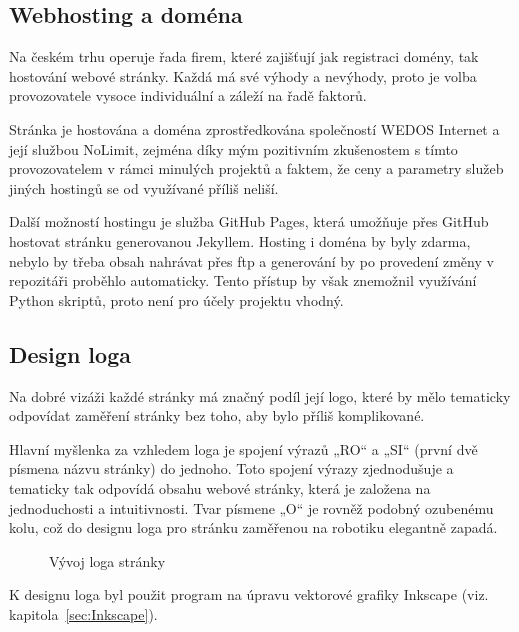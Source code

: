 \documentclass[a4paper, 12pt]{article}
\newcommand*{\fullref}[1]{\hyperref[{#1}]{\ref*{#1}}}
\begin{document}
  \subsection{Webhosting a doména} \label{sec:Webhosting a doména}
  Na českém trhu operuje řada firem, které zajišťují jak registraci domény, tak hostování webové stránky. Každá má své výhody a nevýhody, proto je volba provozovatele vysoce individuální a záleží na řadě faktorů.

  Stránka je hostována a doména zprostředkována společností WEDOS Internet a její službou NoLimit, zejména díky mým pozitivním zkušenostem s tímto provozovatelem v rámci minulých projektů a faktem, že ceny a parametry služeb jiných hostingů se od využívané příliš neliší.

  Další možností hostingu je služba GitHub Pages, která umožňuje přes GitHub hostovat stránku generovanou Jekyllem. Hosting i doména by byly zdarma, nebylo by třeba obsah nahrávat přes \acrshort{ftp} a generování by po provedení změny v repozitáři proběhlo automaticky. Tento přístup by však znemožnil využívání Python skriptů, proto není pro účely projektu vhodný.


  \subsection{Design loga}
  Na dobré vizáži každé stránky má značný podíl její logo, které by mělo tematicky odpovídat zaměření stránky bez toho, aby bylo příliš komplikované.

  Hlavní myšlenka za vzhledem loga je spojení výrazů „RO“ a „SI“ (první dvě písmena názvu stránky) do jednoho. Toto spojení výrazy zjednodušuje a tematicky tak odpovídá obsahu webové stránky, která je založena na jednoduchosti a intuitivnosti. Tvar písmene „O“ je rovněž podobný ozubenému kolu, což do designu loga pro stránku zaměřenou na robotiku elegantně zapadá.

  \begin{figure}[H]%
    \centering

    \hfill
    \hfill

    \caption{Vývoj loga stránky}%
    \label{img:Vývoj loga stránky}%
  \end{figure}

  K designu loga byl použit program na úpravu vektorové grafiky Inkscape (viz. kapitola~\fullref{sec:Inkscape}).
\end{document}
